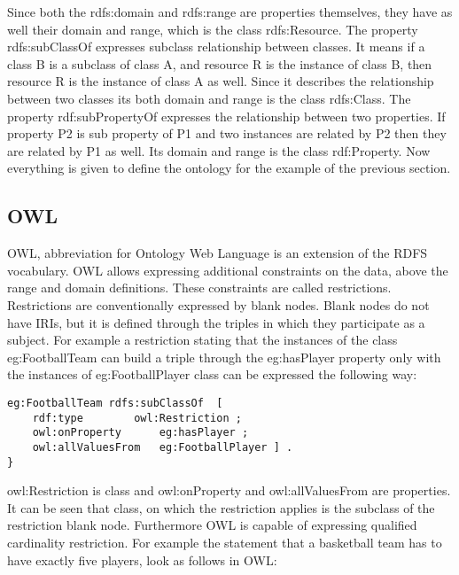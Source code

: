 
Since both the rdfs:domain and rdfs:range are properties themselves, they have as well their domain and range, which is the class rdfs:Resource. 
The property rdfs:subClassOf expresses subclass relationship between classes. It means if a class B is a subclass of class A, and resource R is the instance of class B, then resource R is the instance of class A as well. Since it describes the relationship between two classes its both domain and range is the class rdfs:Class. 
The property rdf:subPropertyOf expresses the relationship between two properties. If property P2 is sub property of P1 and two instances are related by P2 then they are related by P1 as well. Its domain and range is the class  rdf:Property.
Now everything is given to define the ontology for the example of the previous section.



\subsection{OWL}

OWL, abbreviation for Ontology Web Language is an extension of the RDFS vocabulary. OWL allows expressing additional constraints on the data, above the range and domain definitions. These constraints are called restrictions. Restrictions are conventionally expressed by blank nodes. Blank nodes do not have IRIs, but it is defined through the triples in which they participate as a subject. For example a restriction stating that the instances of the class eg:FootballTeam can build a triple through the eg:hasPlayer property only with the instances of eg:FootballPlayer class can be expressed the following way:

\begin{lstlisting}[basicstyle=\footnotesize, captionpos=b, caption=OWL restriction in N3 format, label=lst:sparql,
frame=single]
eg:FootballTeam rdfs:subClassOf  [ 
	rdf:type		owl:Restriction ; 
	owl:onProperty		eg:hasPlayer ; 
	owl:allValuesFrom	eg:FootballPlayer ] . 
}
\end{lstlisting}

owl:Restriction is class and owl:onProperty and owl:allValuesFrom are properties. It can be seen that class, on which the restriction applies is the subclass of the restriction blank node.
Furthermore OWL is capable of expressing qualified cardinality restriction. For example the statement that a basketball team has to have exactly five players, look as follows in OWL:


